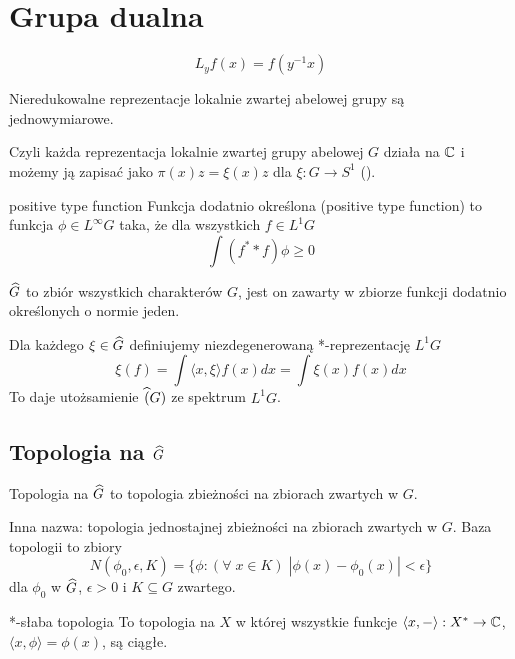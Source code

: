 \section{Grupa dualna}

$$L_yf(x)=f(y^{-1}x)$$

\begin{theorem}{}{}
  Nieredukowalne reprezentacje lokalnie zwartej abelowej grupy są jednowymiarowe.
\end{theorem}

Czyli każda reprezentacja lokalnie zwartej grupy abelowej $G$ działa na $\C$ i możemy ją zapisać jako $\pi(x)z=\xi(x)z$ dla $\xi:G\to S^1$ ().

\begin{definition}{positive type function}{}
Funkcja dodatnio określona (positive type function) to funkcja $\phi\in L^\infty G$ taka, że dla wszystkich $f\in L^1G$ 
$$\int (f^*\ast f)\phi\geq 0$$
\end{definition}

$\Hat{G}$ to zbiór wszystkich charakterów $G$, jest on zawarty w zbiorze funkcji dodatnio określonych o normie jeden. 

\begin{theorem}{}{}
  Dla każdego $\xi\in\Hat{G}$ definiujemy niezdegenerowaną *-reprezentację $L^1G$
  $$\xi(f)=\int \langle x,\xi\rangle f(x)dx=\int\xi(x)f(x)dx$$
  To daje utożsamienie $\Hat(G)$ ze spektrum $L^1G$.
\end{theorem}

\subsection{Topologia na $\Hat{G}$}

\begin{definition}{}{}
  Topologia na $\Hat{G}$ to topologia zbieżności na zbiorach zwartych w $G$. 
\end{definition}

Inna nazwa: topologia jednostajnej zbieżności na zbiorach zwartych w $G$. Baza topologii to zbiory 
$$N(\phi_0, \epsilon, K)=\{\phi:(\forall\;x\in K)\;|\phi(x)-\phi_0(x)|<\epsilon\}$$
dla $\phi_0$ w $\Hat{G}$, $\epsilon>0$ i $K\subseteq G$ zwartego.


\begin{definition}{*-słaba topologia}{}
  To topologia na $X$ w której wszystkie funkcje $\langle x, -\rangle:X^*\to \C$, $\langle x,\phi\rangle =\phi(x)$, są ciągłe.
\end{definition}

